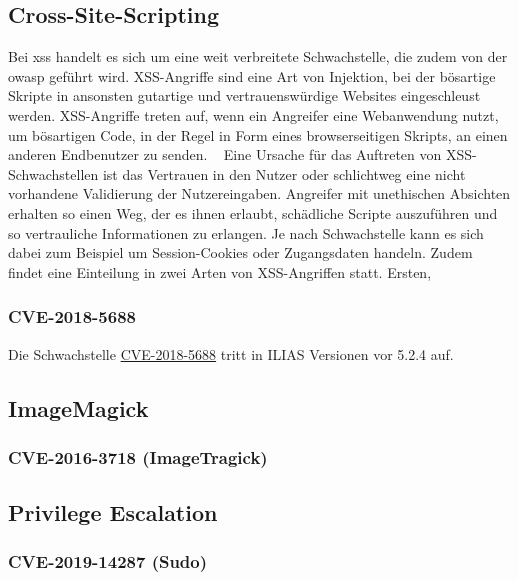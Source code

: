 \documentclass[10pt, a4paper,onecolumn ,titlepage]{article}
\begin{document}
    \subsection{Cross-Site-Scripting}
    \label{subsec:CrossSiteScripting}
    Bei \ac{xss} handelt es sich um eine weit verbreitete Schwachstelle, die zudem von der \ac{owasp} geführt wird.
    XSS-Angriffe sind eine Art von Injektion, bei der bösartige Skripte in ansonsten gutartige und vertrauenswürdige Websites eingeschleust werden.
    XSS-Angriffe treten auf, wenn ein Angreifer eine Webanwendung nutzt, um bösartigen Code, in der Regel in Form eines browserseitigen Skripts, an einen anderen Endbenutzer zu senden. ~\textcite{RN1}
    Eine Ursache für das Auftreten von XSS-Schwachstellen ist das Vertrauen in den Nutzer oder schlichtweg eine nicht vorhandene Validierung der Nutzereingaben.
    Angreifer mit unethischen Absichten erhalten so einen Weg, der es ihnen erlaubt, schädliche Scripte auszuführen und so vertrauliche Informationen zu erlangen.
    Je nach Schwachstelle kann es sich dabei zum Beispiel um Session-Cookies oder Zugangsdaten handeln.
    Zudem findet eine Einteilung in zwei Arten von XSS-Angriffen statt. Ersten,

    \subsubsection{CVE-2018-5688}
    \label{subsubsec:CVE-2018-5688}
    Die Schwachstelle \href{https://www.cve.org/CVERecord?id=CVE-2018-5688}{CVE-2018-5688} tritt in ILIAS Versionen vor 5.2.4 auf.

    \subsection{ImageMagick}
    \label{subsec:ImageMagick}


    \subsubsection{CVE-2016-3718 (ImageTragick)}
    \label{subsubsec:CVE-2016-3718}

    \subsection{Privilege Escalation}
    \label{subsec:PrivilegeEscalation}

    \subsubsection{CVE-2019-14287 (Sudo)}
\end{document}
